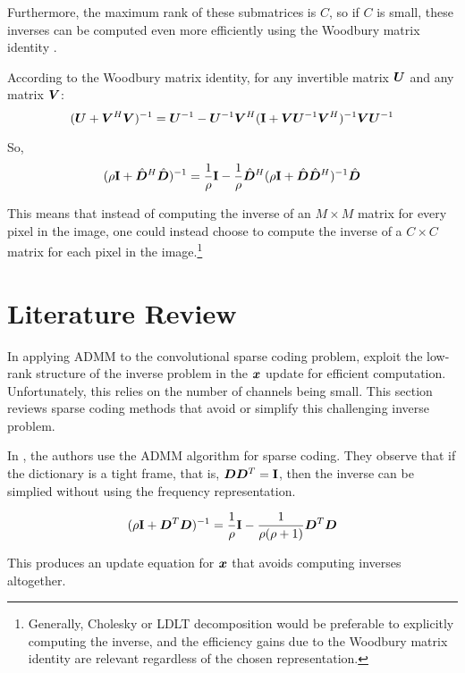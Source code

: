 Furthermore, the maximum rank of these submatrices is $C$, so if $C$ is small, these inverses can be computed even more efficiently using the Woodbury matrix identity \cite{vsorel2016fast} \cite{heide2015fast} \cite{wohlberg2015efficient}.

According to the Woodbury matrix identity, for any invertible matrix $\bm{U}$ and any matrix $\bm{V}$:
\begin{equation}
(\bm{U} + \bm{V}^H\bm{V})^{-1} = \bm{U}^{-1} - \bm{U}^{-1}\bm{V}^H({\bf I} + \bm{V}\bm{U}^{-1}\bm{V}^H)^{-1}\bm{V}\bm{U}^{-1}
\end{equation}

So,
\begin{equation}
(\rho{\bf I} + \hat{\bm{D}}^H\hat{\bm{D}})^{-1} = \frac{1}{\rho}{\bf I} - \frac{1}{\rho}\hat{\bm{D}}^H(\rho{\bf I} + \hat{\bm{D}}\hat{\bm{D}}^H)^{-1}\hat{\bm{D}}
\end{equation}

This means that instead of computing the inverse of an $M \times M$ matrix for every pixel in the image, one could instead choose to compute the inverse of a $C \times C$ matrix for each pixel in the image.\footnote{Generally, Cholesky or LDLT decomposition would be preferable to explicitly computing the inverse, and the efficiency gains due to the Woodbury matrix identity are relevant regardless of the chosen representation.}

\section{Literature Review}
In applying ADMM to the convolutional sparse coding problem, \cite{vsorel2016fast} \cite{heide2015fast} \cite{wohlberg2015efficient} exploit the low-rank structure of the inverse problem in the $\bm{x}$ update for efficient computation. Unfortunately, this relies on the number of channels being small. This section reviews sparse coding methods that avoid or simplify this challenging inverse problem.

In \cite{chodosh2018deep}\cite{murdock2018deep}, the authors use the ADMM algorithm for sparse coding. They observe that if the dictionary is a tight frame, that is, $\bm{D}\bm{D}^T = {\bf I}$, then the inverse can be simplied without using the frequency representation.

\begin{equation}
(\rho{\bf I} + \bm{D}^T\bm{D})^{-1} = \frac{1}{\rho}{\bf I} - \frac{1}{\rho(\rho + 1)}\bm{D}^T\bm{D}
\end{equation}

This produces an update equation for $\bm{x}$ that avoids computing inverses altogether.

